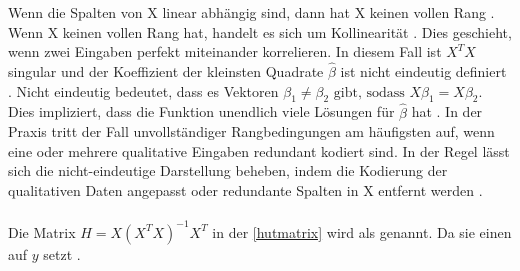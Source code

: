 Wenn die Spalten von X linear abhängig sind, dann hat X keinen vollen Rang \cite{hastie2009elements}. Wenn X keinen vollen Rang hat, handelt es sich um Kollinearität \cite{Maronna2019Robust}. Dies geschieht, wenn zwei Eingaben perfekt miteinander korrelieren. In diesem Fall ist \(X^TX\) singular und der Koeffizient der kleinsten Quadrate $\hat{\beta}$ ist nicht eindeutig definiert \cite{hastie2009elements}. Nicht eindeutig bedeutet, dass es Vektoren \(\beta_1 \neq \beta_2 \text{ gibt, sodass } X\beta_1 = X\beta_2\). Dies impliziert, dass die Funktion unendlich viele Lösungen für $\hat{\beta}$ hat \cite{Maronna2019Robust}. In der Praxis tritt der Fall unvollständiger Rangbedingungen am häufigsten auf, wenn eine oder mehrere qualitative Eingaben redundant kodiert sind. In der Regel lässt sich die nicht-eindeutige Darstellung beheben, indem die Kodierung der qualitativen Daten angepasst oder redundante Spalten in X entfernt werden \cite{hastie2009elements}. \\\\
Die Matrix \( H = X (X^T X)^{-1} X^T \) in der \autoref{hutmatrix} wird als  genannt. Da sie einen  auf \(y\) setzt \cite{huber1981robust}. 

